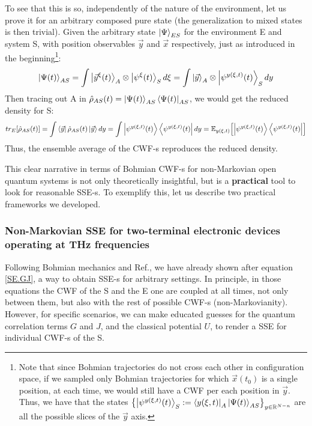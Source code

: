 \documentclass[11pt, a4paper]{article} %
\newcommand{\R}{\mathbb{R}} %
\begin{document}
To see that this is so, independently of the nature of the environment, let us prove it for an arbitrary composed pure state (the generalization to mixed states is then trivial). Given the arbitrary state $\ket{\Psi}_{ES}$ for the environment E and system S, with position observables $\vec{y}$ and $\vec{x}$ respectively, just as introduced in the beginning\footnote{Note that since Bohmian trajectories do not cross each other in configuration space, if we sampled only Bohmian trajectories for which $\vec{x}(t_0)$ is a single position, at each time, we would still have a CWF per each position in $\vec{y}$. Thus, we have that the states $\qty{\ket{\psi^{y(\xi,t)}(t)}_S:=\bra{y(\xi,t)}_A\ket{\Psi(t)}_{AS}}_{y\in\R^{N-n}}$ are all the possible slices of the $\vec{y}$ axis.}:\vspace{-0.2cm}
\begin{equation}
\ket{\Psi(t)}_{AS}=\int\ket{\vec{y}^\xi(t)}_A\otimes \ket{\psi^\xi(t)}_S d\xi = \int\ket{\vec{y}}_A\otimes \ket{\psi^{y(\xi,t)}(t)}_S dy
\end{equation}
Then tracing out A in $\hat{\rho}_{AS}(t)=\ket{\Psi(t)}_{AS}\bra{\Psi(t)}_{AS}$, we would get the reduced density for S:
\begin{equation}
tr_E\qty[\hat{\rho}_{AS}(t)] = \int\bra{\vec{y}}\hat{\rho}_{AS}(t)\ket{\vec{y}}dy = \int \ket{\psi^{y(\xi,t)}(t)}\bra{\psi^{y(\xi,t)}(t)} dy = \mathbb{E}_{y(\xi,t)}\qty[\ket{\psi^{y(\xi,t)}(t)}\bra{\psi^{y(\xi,t)}(t)}]
\end{equation}
Thus, the ensemble average of the CWF-s reproduces the reduced density.

This clear narrative in terms of Bohmian CWF-s for non-Markovian open quantum systems is not only theoretically insightful, but is a {\bf practical} tool to look for reasonable SSE-s. To exemplify this, let us describe two practical frameworks we developed.

\subsubsection*{Non-Markovian SSE for two-terminal electronic devices operating at THz frequencies}
Following Bohmian mechanics and Ref.\cite{GJ}, we have already shown after equation \eqref{SE.GJ}, a way to obtain SSE-s for arbitrary settings. In principle, in those equations the CWF of the S and the E one are coupled at all times, not only between them, but also with the rest of possible CWF-s (non-Markovianity). However, for specific scenarios, we can make educated guesses for the quantum correlation terms $G$ and $J$, and the classical potential $U$, to render a SSE for individual CWF-s of the S.
\end{document}
